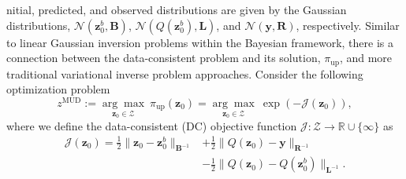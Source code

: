 \documentclass[final,1p,times]{elsarticle}
\begin{document}
nitial, predicted, and observed distributions are given by the Gaussian distributions, $\mathcal{N}(\mathbf{z}_0^b, \mathbf{B})$, $\mathcal{N}(Q(\mathbf{z}_0^b), \mathbf{L})$, and $\mathcal{N}(\mathbf{y}, \mathbf{R})$, respectively. 
Similar to linear Gaussian inversion problems within the Bayesian framework, there is a connection between the data-consistent problem and its solution, $\pi_{\mathrm{up}}$, and more traditional variational inverse problem approaches. 
Consider the following optimization problem
\begin{equation} 
    z^{\mathrm{MUD}}:=  \underset{\mathbf{z}_{0}\in \mathcal{Z}}{\arg\max} \  \pi_{\mathrm{up}} \left(\mathbf{z}_{0} \right)
    = \underset{\mathbf{z}_{0} \in \mathcal{Z}}{\arg \max} \  \exp \left( -  \mathcal{J}\left(\mathbf{z}_{0}\right)   \right), \label{eq:mud_exp}
\end{equation}
where we define the data-consistent (DC) objective function $\mathcal{J}:\mathcal{Z} \to \mathbb{R}\cup \{\infty\}$ as 
\begin{equation}
\begin{split}
    \mathcal{J}\left(\mathbf{z}_{0}\right)  
    = \frac{1}{2}\| \mathbf{z}_{0} - \mathbf{z}_0^b \|_{\mathbf{B}^{-1}} 
    &+ \frac{1}{2}\| Q\left(\mathbf{z}_{0} \right) - \mathbf{y}\|_{\mathbf{R}^{-1}}  \\
    &- \frac{1}{2}\| Q\left(\mathbf{z}_{0} \right) - Q\left(\mathbf{z}_0^b\right) \|_{\mathbf{L}^{-1}} . \label{eq:dc_obj}
\end{split}
\end{equation}
\end{document}
